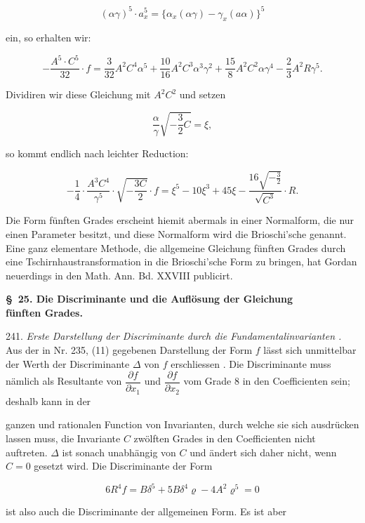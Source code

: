 \[ (\alpha\gamma)^5\cdot a_x^5=\{\alpha_x(\alpha\gamma)-\gamma_x(a\alpha)\}^5 \]

ein, so erhalten wir:

\[ -\frac{A^5\cdot C^5}{32}\cdot f = \frac{3}{32}A^2C^4\alpha^5+\frac{10}{16}A^2C^3\alpha^3\gamma^2+\frac{15}{8}A^2C^2\alpha\gamma^4-\frac{2}{3}A^2R\gamma^5. \]

Dividiren wir diese Gleichung mit $A^2C^2$ und setzen

\[ \frac{\alpha}{\gamma}\sqrt{-\frac{3}{2}C}=\xi, \]

so kommt endlich nach leichter Reduction:

\[ -\frac{1}{4}\cdot\frac{A^3C^4}{\gamma^5}\cdot\sqrt{-\frac{3C}{2}}\cdot f=\xi^5-10\xi^3+45\xi-\frac{16\sqrt{-\frac{3}{2}}}{\sqrt{C^3}}\cdot R. \]

Die Form fünften Grades erscheint hiemit abermals in einer
Normalform, die nur einen Parameter besitzt, und diese Normalform
wird die Brioschi'sche genannt. Eine ganz elementare Methode,
die allgemeine Gleichung fünften Grades durch eine Tschirnhaustransformation
 in die Brioschi'sche Form zu bringen, hat Gordan
neuerdings in den Math. Ann. Bd. XXVIII publicirt.

\begin{center}
\textbf{\S\ 25. Die Discriminante und die Auflösung der Gleichung}\\
\textbf{fünften Grades.}
\end{center}

241. \textit{Erste Darstellung der Discriminante durch die Fundamentalinvarianten
.} Aus der in Nr. 235, (11) gegebenen Darstellung der Form
$f$ lässt sich unmittelbar der Werth der Discriminante $\Delta$ von $f$ erschliessen
. Die Discriminante muss nämlich als Resultante von $\dfrac{\partial f}{\partial x_1}$
und $\dfrac{\partial f}{\partial x_2}$ vom Grade 8 in den Coefficienten sein; deshalb kann in der


ganzen und rationalen Function von Invarianten, durch welche sie
sich ausdrücken lassen muss, die Invariante $C$ zwölften Grades in
den Coefficienten nicht auftreten. $\Delta$ ist sonach unabhängig von $C$
und ändert sich daher nicht, wenn $C=0$ gesetzt wird. Die Discriminante
der Form

\[ 6R^4f = B\delta^5+5B\delta^4\varrho-4A^2\varrho^5=0 \]

ist also auch die Discriminante der allgemeinen Form. Es ist aber


